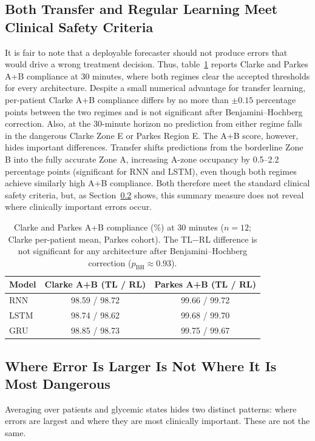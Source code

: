 \documentclass[conference]{IEEEtran}
\begin{document}
\subsection{Both Transfer and Regular Learning Meet Clinical Safety Criteria}
\label{sec:res-safety}
It is fair to note that a deployable forecaster should not produce errors that would drive a wrong treatment
decision. Thus, table~\ref{tab:ega} reports Clarke and Parkes A+B compliance at 30
minutes, where both regimes clear the accepted thresholds for every architecture. Despite a small numerical advantage for transfer learning, per-patient Clarke A+B compliance differs by no more than $\pm0.15$ percentage points between the two regimes and is not significant after Benjamini--Hochberg correction. Also, at the 30-minute horizon no
prediction from either regime falls in the dangerous Clarke Zone E or Parkes
Region E. The A+B score, however, hides important differences. Transfer shifts predictions from the borderline Zone B into the fully accurate Zone A, increasing A-zone occupancy by 0.5--2.2 percentage points (significant for RNN and LSTM), even though both regimes achieve similarly high A+B compliance. Both therefore meet the standard clinical safety criteria, but, as Section~\ref{sec:res-localization} shows, this summary measure does not reveal where clinically important errors occur.

\begin{table}[t]
\centering
\caption{Clarke and Parkes A+B compliance (\%) at 30 minutes ($n=12$; Clarke
per-patient mean, Parkes cohort). The TL$-$RL difference is not significant for any
architecture after Benjamini--Hochberg correction ($p_{\text{BH}}\approx0.93$).}
\label{tab:ega}
\small
\begin{tabular}{@{}lcc@{}}
\toprule
Model & Clarke A+B (TL / RL) & Parkes A+B (TL / RL) \\
\midrule
RNN  & 98.59 / 98.72 & 99.66 / 99.72 \\
LSTM & 98.74 / 98.62 & 99.68 / 99.70 \\
GRU  & 98.85 / 98.73 & 99.75 / 99.67 \\
\bottomrule
\end{tabular}
\end{table}

\subsection{Where Error Is Larger Is Not Where It Is Most Dangerous}
\label{sec:res-localization}
Averaging over patients and glycemic states hides two distinct patterns: where errors are largest and where they are most clinically important. These are not the same.
\end{document}
